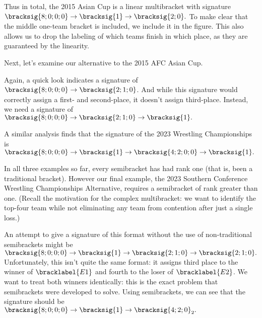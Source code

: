 {    Thus in total, the 2015 Asian Cup is a linear multibracket with signature $\bracksig{8;0;0;0} \to \bracksig{1} \to \bracksig{2;0}.$ To make clear that the middle one-team bracket is included, we include it in the figure. This also allows us to drop the labeling of which teams finish in which place, as they are guaranteed by the linearity.


    Next, let's examine our alternative to the 2015 AFC Asian Cup.


    Again, a quick look indicates a signature of $\bracksig{8;0;0;0} \to \bracksig{2;1;0}$. And while this signature would correctly assign a first- and second-place, it doesn't assign third-place. Instead, we need a signature of $\bracksig{8;0;0;0} \to \bracksig{2;1;0} \to \bracksig{1}.$


    A similar analysis finds that the signature of the 2023 Wrestling Championships is $\bracksig{8;0;0;0} \to \bracksig{1} \to \bracksig{4;2;0;0} \to \bracksig{1}.$


    In all three examples so far, every semibracket has had rank one (that is, been a traditional bracket). However our final example, the 2023 Southern Conference Wrestling Championships Alternative, requires a semibracket of rank greater than one. (Recall the motivation for the complex multibracket: we want to identify the top-four team while not eliminating any team from contention after just a single loss.)


    An attempt to give a signature of this format without the use of non-traditional semibrackets might be $\bracksig{8;0;0;0} \to \bracksig{1} \to \bracksig{2;1;0} \to \bracksig{2;1;0}.$ Unfortunately, this isn't quite the same format: it assigns third place to the winner of $\bracklabel{E1}$ and fourth to the loser of $\bracklabel{E2}$. We want to treat both winners identically: this is the exact problem that semibrackets were developed to solve. Using semibrackets, we can see that the signature should be $\bracksig{8;0;0;0} \to \bracksig{1} \to \bracksig{4;2;0}_2.$

}

